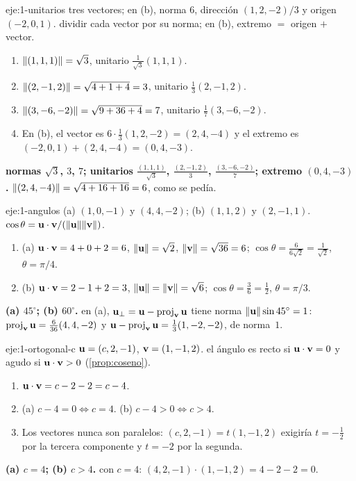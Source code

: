 \begin{solucion}{eje:1-unitarios}
\datos tres vectores; en (b), norma 6, dirección $(1,2,-2)/3$ y origen $(-2,0,1)$.
\planteamiento dividir cada vector por su norma; en (b), extremo $=$ origen $+$ vector.
\pasos
\begin{enumerate}[label=\arabic*.]
  \item $\lVert(1,1,1)\rVert=\sqrt3$, unitario $\frac{1}{\sqrt3}(1,1,1)$.
  \item $\lVert(2,-1,2)\rVert=\sqrt{4+1+4}=3$, unitario $\frac13(2,-1,2)$.
  \item $\lVert(3,-6,-2)\rVert=\sqrt{9+36+4}=7$, unitario $\frac17(3,-6,-2)$.
  \item En (b), el vector es $6\cdot\frac13(1,2,-2)=(2,4,-4)$ y el extremo es $(-2,0,1)+(2,4,-4)=(0,4,-3)$.
\end{enumerate}
\resultado \textbf{normas $\sqrt3$, $3$, $7$; unitarios $\frac{(1,1,1)}{\sqrt3}$, $\frac{(2,-1,2)}{3}$, $\frac{(3,-6,-2)}{7}$; extremo $(0,4,-3)$.}
\comprobacion $\lVert(2,4,-4)\rVert=\sqrt{4+16+16}=6$, como se pedía.
\end{solucion}

\begin{solucion}{eje:1-angulos}
\datos (a) $(1,0,-1)$ y $(4,4,-2)$; (b) $(1,1,2)$ y $(2,-1,1)$.
\planteamiento $\cos\theta=\mathbf{u}\cdot\mathbf{v}/(\lVert\mathbf{u}\rVert\lVert\mathbf{v}\rVert)$.
\pasos
\begin{enumerate}[label=\arabic*.]
  \item (a) $\mathbf{u}\cdot\mathbf{v}=4+0+2=6$, $\lVert\mathbf{u}\rVert=\sqrt2$, $\lVert\mathbf{v}\rVert=\sqrt{36}=6$; $\cos\theta=\frac{6}{6\sqrt2}=\frac{1}{\sqrt2}$, $\theta=\pi/4$.
  \item (b) $\mathbf{u}\cdot\mathbf{v}=2-1+2=3$, $\lVert\mathbf{u}\rVert=\lVert\mathbf{v}\rVert=\sqrt6$; $\cos\theta=\frac36=\frac12$, $\theta=\pi/3$.
\end{enumerate}
\resultado \textbf{(a) $45^\circ$; (b) $60^\circ$.}
\comprobacion en (a), $\mathbf{u}_\perp=\mathbf{u}-\operatorname{proj}_{\mathbf{v}}\mathbf{u}$ tiene norma $\lVert\mathbf{u}\rVert\sin45^\circ=1$: $\operatorname{proj}_{\mathbf{v}}\mathbf{u}=\frac{6}{36}(4,4,-2)$ y $\mathbf{u}-\operatorname{proj}_{\mathbf{v}}\mathbf{u}=\frac13(1,-2,-2)$, de norma~$1$.
\end{solucion}

\begin{solucion}{eje:1-ortogonal-c}
\datos $\mathbf{u}=(c,2,-1)$, $\mathbf{v}=(1,-1,2)$.
\planteamiento el ángulo es recto si $\mathbf{u}\cdot\mathbf{v}=0$ y agudo si $\mathbf{u}\cdot\mathbf{v}>0$ (\cref{prop:coseno}).
\pasos
\begin{enumerate}[label=\arabic*.]
  \item $\mathbf{u}\cdot\mathbf{v}=c-2-2=c-4$.
  \item (a) $c-4=0\iff c=4$. (b) $c-4>0\iff c>4$.
  \item Los vectores nunca son paralelos: $(c,2,-1)=t(1,-1,2)$ exigiría $t=-\frac12$ por la tercera componente y $t=-2$ por la segunda.
\end{enumerate}
\resultado \textbf{(a) $c=4$; (b) $c>4$.}
\comprobacion con $c=4$: $(4,2,-1)\cdot(1,-1,2)=4-2-2=0$.
\end{solucion}

